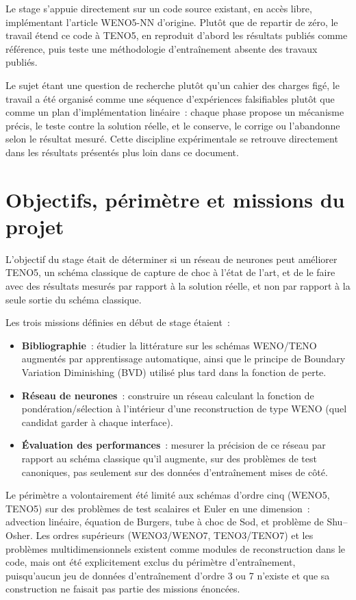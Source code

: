 \documentclass[11pt]{article}
\begin{document}
Le stage s'appuie directement sur un code source existant, en accès
libre, implémentant l'article WENO5-NN d'origine. Plutôt que de repartir
de zéro, le travail étend ce code à TENO5, en reproduit d'abord les
résultats publiés comme référence, puis teste une méthodologie
d'entraînement absente des travaux publiés.

Le sujet étant une question de recherche plutôt qu'un cahier des charges
figé, le travail a été organisé comme une séquence d'expériences
falsifiables plutôt que comme un plan d'implémentation linéaire~: chaque
phase propose un mécanisme précis, le teste contre la solution réelle, et
le conserve, le corrige ou l'abandonne selon le résultat mesuré. Cette
discipline expérimentale se retrouve directement dans les résultats
présentés plus loin dans ce document.

\section{Objectifs, périmètre et missions du projet}

L'objectif du stage était de déterminer si un réseau de neurones peut
améliorer TENO5, un schéma classique de capture de choc à l'état de
l'art, et de le faire avec des résultats mesurés par rapport à la solution
réelle, et non par rapport à la seule sortie du schéma classique.

Les trois missions définies en début de stage étaient~:

\begin{itemize}
    \item \textbf{Bibliographie}~: étudier la littérature sur les schémas
    WENO/TENO augmentés par apprentissage automatique, ainsi que le
    principe de Boundary Variation Diminishing (BVD) utilisé plus tard
    dans la fonction de perte.
    \item \textbf{Réseau de neurones}~: construire un réseau calculant la
    fonction de pondération/sélection à l'intérieur d'une reconstruction
    de type WENO (quel candidat garder à chaque interface).
    \item \textbf{Évaluation des performances}~: mesurer la précision de
    ce réseau par rapport au schéma classique qu'il augmente, sur des
    problèmes de test canoniques, pas seulement sur des données
    d'entraînement mises de côté.
\end{itemize}

Le périmètre a volontairement été limité aux schémas d'ordre cinq (WENO5,
TENO5) sur des problèmes de test scalaires et Euler en une dimension~:
advection linéaire, équation de Burgers, tube à choc de Sod, et problème
de Shu--Osher. Les ordres supérieurs (WENO3/WENO7, TENO3/TENO7) et les
problèmes multidimensionnels existent comme modules de reconstruction dans
le code, mais ont été explicitement exclus du périmètre d'entraînement,
puisqu'aucun jeu de données d'entraînement d'ordre 3 ou 7 n'existe et que
sa construction ne faisait pas partie des missions énoncées.
\end{document}
